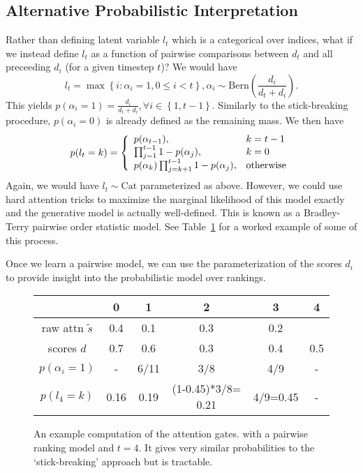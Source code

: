 \documentclass{article}
\newcommand\set[1]{\left\{#1\right\}}
\newcommand{\Cat}{\mathrm{Cat}}
\newcommand\Bern{\mathrm{Bern}}
\begin{document}
\subsection{Alternative Probabilistic Interpretation}
Rather than defining latent variable $l_t$ which is a categorical over indices,
what if we instead define $l_t$ as a function of pairwise comparisons between $d_t$
and all preceeding $d_i$ (for a given timestep $t$)?
We would have
$$l_t = \max \set{i : \alpha_i = 1, 0\leq i<t},
\alpha_i \sim \Bern\left(\frac{d_i}{d_t+d_i}\right).$$
This yields
$p(\alpha_i=1)=\frac{d_i}{d_t+d_i}, \forall i\in\set{1,t-1}$.
Similarly to the stick-breaking procedure, $p(\alpha_i=0)$ is already defined as the remaining mass.
We then have
\begin{equation*}
p(l_t=k) =\left\{\begin{array}{l l}
p(\alpha_{t-1}), & k=t-1\\
\prod_{j=1}^{t-1}1-p(\alpha_j), & k=0\\
p(\alpha_k)\prod_{j=k+1}^{t-1}1-p(\alpha_j), & \textrm{otherwise}
\end{array}\right.
\end{equation*}
Again, we would have $l_t\sim\Cat$ parameterized as above.
However, we could use hard attention tricks to maximize the marginal likelihood of this model exactly
and the generative model is actually well-defined.
This is known as a Bradley-Terry pairwise order statistic model.
See Table~\ref{fig:geom} for a worked example of some of this process.

Once we learn a pairwise model, we can use the parameterization of the scores $d_i$
to provide insight into the probabilistic model over rankings.

\begin{figure}
\centering
\begin{tabular}{|c|c|c|c|c|c|}
\hline
& 0 & 1 & 2 & 3 & 4\\
\hline
raw attn $\tilde{s}$ & 0.4 & 0.1 & 0.3 & 0.2 & \\
\hline
scores $d$         & 0.7 & 0.6 & 0.3 & 0.4 & 0.5\\
\hline
$p(\alpha_i=1)$    & - & 6/11 & 3/8 & 4/9 & -\\
\hline
$p(l_4=k)$ & 0.16 & 0.19 & (1-0.45)*3/8= 0.21 & 4/9=0.45 & -\\
\hline
\end{tabular}
\caption{An example computation of the attention gates.
with a pairwise ranking model and $t=4$.
It gives very similar probabilities to the `stick-breaking' approach but is tractable.}
\label{fig:geom}
\end{figure}
\end{document}

